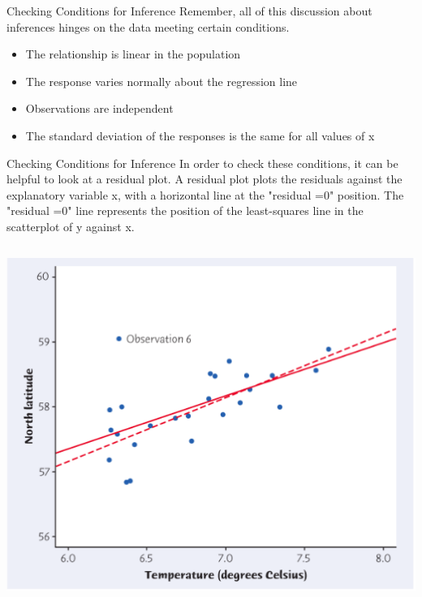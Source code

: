 \documentclass{beamer}
\begin{document}
\begin{frame}{Checking Conditions for Inference}
	Remember, all of this discussion about inferences hinges on the data meeting certain conditions. 
	\begin{itemize}
		\item The relationship is linear in the population
		\item The response varies normally about the regression line
		\item Observations are independent
		\item The standard deviation of the responses is the same for all values of x
	\end{itemize}
\end{frame}

\begin{frame}{Checking Conditions for Inference}
	In order to check these conditions, it can be helpful to look at a residual plot. A \alert{residual plot} plots the residuals against the explanatory variable x, with a horizontal line at the "residual =0" position. The "residual =0" line represents the position of the least-squares line in the scatterplot of y against x.
	\begin{columns}
		\includegraphics[width=\textwidth]{scatter}

\end{columns}
\end{frame}
\end{document}
